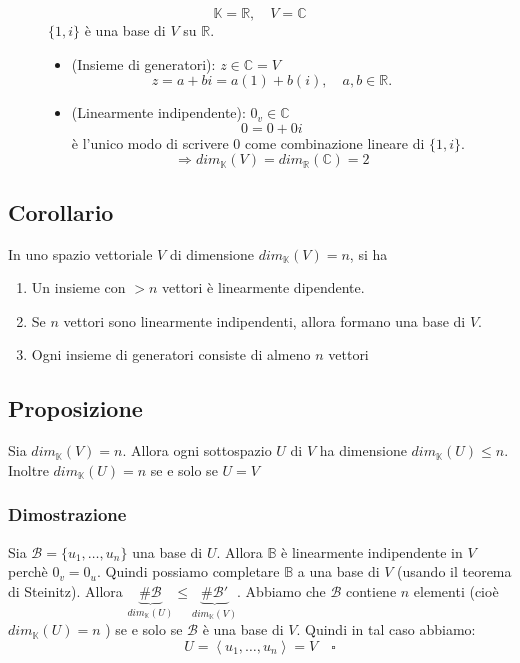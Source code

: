 \documentclass[a4paper]{article}
\theoremstyle{break}
\theoremstyle{break}
\theoremstyle{break}
\theoremstyle{break}
\begin{document}
\begin{figure}[H]
  \begin{example}
    \[
    \mathbb{K} = \mathbb{R}, \quad V = \mathbb{C}
    \] 
    \( \{1, i\}  \) è una base di \( V \) su \( \mathbb{R} \).
    \begin{itemize}
      \item (Insieme di generatori): \( z \in \mathbb{C} = V \) 
        \[
        z = a + bi = a(1) + b(i), \quad a,b \in \mathbb{R}. 
        \] 
      \item (Linearmente indipendente): \( 0_v \in \mathbb{C} \) 
        \[
        0 = 0 + 0i
        \] 
        è l'unico modo di scrivere \( 0 \) come combinazione lineare di \( \{1,i\}  \).
        \[
          \Rightarrow dim_{\mathbb{K}}(V) = dim_{\mathbb{R}}(\mathbb{C}) = 2
        \] 
    \end{itemize}
  \end{example}
\end{figure}

\subsection{Corollario}
In uno spazio vettoriale \( V \) di dimensione \( dim_{\mathbb{K}}(V) = n \), si ha
\begin{enumerate}
  \item Un insieme con \( > n \) vettori è linearmente dipendente.
  \item Se \( n \) vettori sono linearmente indipendenti, allora formano una base di
    \( V \).
  \item Ogni insieme di generatori consiste di almeno \( n \) vettori
\end{enumerate}

\subsection{Proposizione}
Sia \( dim_{\mathbb{K}}(V) = n \). Allora ogni sottospazio \( U \) di \( V \) ha dimensione
\( dim_{\mathbb{K}}(U) \le n \). Inoltre \( dim_{\mathbb{K}}(U) = n \) se e solo se
\( U = V \) 

\subsubsection{Dimostrazione}
Sia \( \mathcal{B} = \{u_1, \ldots, u_n\}  \) una base di \( U \). Allora \( \mathbb{B} \) 
è linearmente indipendente in \( V \) perchè \( 0_v = 0_u \).
Quindi possiamo completare \( \mathbb{B} \) a una base di \( V \) (usando il teorema
di Steinitz). Allora \( \underbrace{\#\mathcal{B}}_{dim_{\mathbb{K}}(U)} \le 
\underbrace{\#\mathcal{B}'}_{dim_{\mathbb{K}}(V)} \).
Abbiamo che \( \mathcal{B} \) contiene \( n \) elementi (cioè \( dim_{\mathbb{K}}(U) = n \) )
se e solo se \( \mathcal{B} \) è una base di \( V \). Quindi in tal caso
abbiamo:
\[
U = \left< u_1, \ldots, u_n \right> = V \quad \square
\] 
\end{document}
